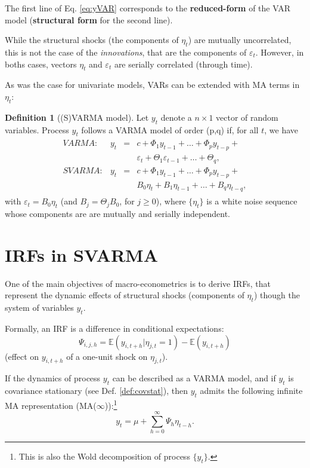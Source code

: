\documentclass[
  12pt,
]{book}
\theoremstyle{definition}
\newtheorem{definition}{Definition}[chapter]
\theoremstyle{definition}
\theoremstyle{definition}
\theoremstyle{definition}
\theoremstyle{remark}
\begin{document}
The first line of Eq. \eqref{eq:yVAR} corresponds to the \textbf{reduced-form} of the VAR model (\textbf{structural form} for the second line).

While the structural shocks (the components of \(\eta_t\)) are mutually uncorrelated, this is not the case of the \emph{innovations}, that are the components of \(\varepsilon_t\). However, in boths cases, vectors \(\eta_t\) and \(\varepsilon_t\) are serially correlated (through time).

As was the case for univariate models, VARs can be extended with MA terms in \(\eta_t\):

\begin{definition}[(S)VARMA model]
\protect\hypertarget{def:SVARMA}{}\label{def:SVARMA}Let \(y_{t}\) denote a \(n \times1\) vector of random variables. Process \(y_{t}\) follows a VARMA model of order (p,q) if, for all \(t\), we have
\begin{eqnarray}
\begin{array}{rllll}
VARMA:& y_t &=& c + \Phi_1 y_{t-1} + \dots + \Phi_p y_{t-p} + \\
&&&\varepsilon_t + \Theta_1\varepsilon_{t-1} + \dots + \Theta_q ,\\
SVARMA:& y_t &=& c + \Phi_1 y_{t-1} + \dots + \Phi_p y_{t-p} + \\
&&& B_0 \eta_t+ B_1 \eta_{t-1} + \dots +  B_q \eta_{t-q},
\end{array}\label{eq:yVARMA}
\end{eqnarray}
with \(\varepsilon_t = B_0\eta_t\) (and \(B_j = \Theta_j B_0\), for \(j \ge 0\)), where \(\{\eta_{t}\}\) is a white noise sequence whose components are are mutually and serially independent.
\end{definition}

\hypertarget{IRFSVARMA}{%
\section{IRFs in SVARMA}\label{IRFSVARMA}}

One of the main objectives of macro-econometrics is to derive IRFs, that represent the dynamic effects of structural shocks (components of \(\eta_t\)) though the system of variables \(y_t\).

Formally, an IRF is a difference in conditional expectations:
\[
\boxed{\Psi_{i,j,h} = \mathbb{E}(y_{i,t+h}|\eta_{j,t}=1) - \mathbb{E}(y_{i,t+h})}
\]
(effect on \(y_{i,t+h}\) of a one-unit shock on \(\eta_{j,t}\)).

If the dynamics of process \(y_t\) can be described as a VARMA model, and if \(y_t\) is covariance stationary (see Def. \ref{def:covstat}), then \(y_t\) admits the following infinite MA representation (MA(\(\infty\))):\footnote{This is also the Wold decomposition of process \(\{y_t\}\).}
\begin{equation}
y_t = \mu + \sum_{h=0}^\infty \Psi_{h} \eta_{t-h}.\label{eq:InfMA}
\end{equation}
\end{document}

